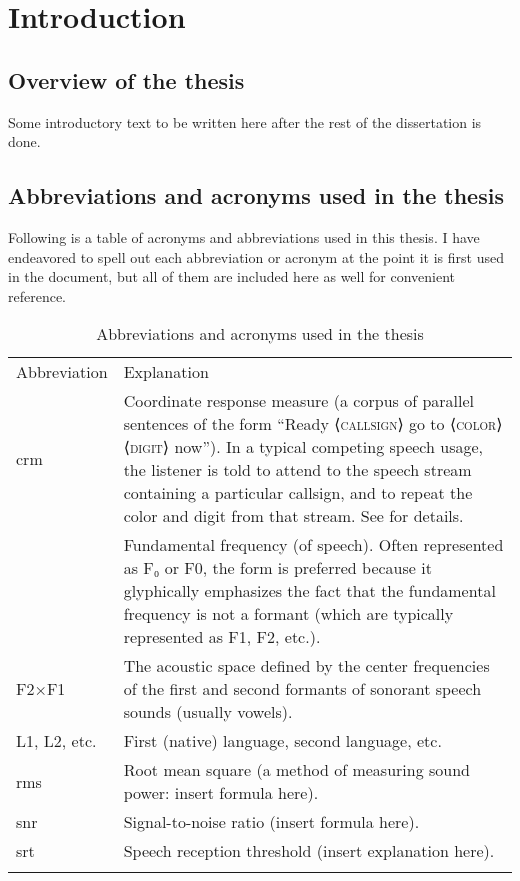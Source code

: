 \chapter{Introduction}
\section[Overview]{Overview of the thesis \label{sec:Overview}}
Some introductory text to be written here after the rest of the dissertation is done.

\section[Abbreviations \& acronyms]{Abbreviations and acronyms used in the thesis \label{sec:Abbr}}
Following is a table of acronyms and abbreviations used in this thesis.  I have endeavored to spell out each abbreviation or acronym at the point it is first used in the document, but all of them are included here as well for convenient reference.

\begin{table}
	\caption[Abbreviations and acronyms]{Abbreviations and acronyms used in the thesis \label{tab:Abbr}}
	\centering
	\begin{tabu} to \textwidth [c]{X[c m] X[5 m]}
		\toprule
		\everyrow{\midrule}
		\rowfont[c]{\bfseries} Abbreviation & Explanation\\
		\ac{crm} & Coordinate response measure (a corpus of parallel sentences of the form “Ready ⟨\textsc{callsign}⟩ go to ⟨\textsc{color}⟩ ⟨\textsc{digit}⟩ now”).  In a typical competing speech usage, the listener is told to attend to the speech stream containing a particular callsign, and to repeat the color and digit from that stream.  See \citet{BoliaEtAl2000} for details.\\
		\fo & Fundamental frequency (of speech).  Often represented as F₀ or F0, the form \fo{} is preferred because it glyphically emphasizes the fact that the fundamental frequency is not a formant (which are typically represented as F1, F2, etc.).\\
		F2×F1 & The acoustic space defined by the center frequencies of the first and second formants of sonorant speech sounds (usually vowels).\\
		L1, L2, etc. & First (native) language, second language, etc.\\
		\ac{rms} & Root mean square (a method of measuring sound power: insert formula here).\\
		\ac{snr} & Signal-to-noise ratio (insert formula here).\\
		\everyrow{}
		\ac{srt} & Speech reception threshold (insert explanation here).\\
		\bottomrule
	\end{tabu}
\end{table}

